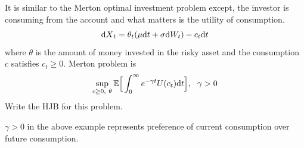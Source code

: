 \documentclass[11pt]{book}
\newcommand{\dt}{\text{\normalfont d}t}
\newcommand{\dX}{\text{\normalfont d}X}
\newcommand{\dW}{\text{\normalfont d}W}
\begin{document}
\begin{ex}
    {}
    It is similar to the Merton optimal investment problem except, the investor is consuming from the account and what matters is the utility of consumption.
    \begin{equation}
        {\dX}_t=\theta_t(\mu {\dt}+ \sigma \dW_t)-c_t{\dt}
    \end{equation}
    where $\theta$ is the amount of money invested in the risky asset and the consumption $c$ satisfies $c_t\ge0$.
    Merton problem is 
    \begin{equation}
        \sup_{c\ge0,~\theta}\mathbb{E}\Big[\int_0^\infty e^{-\gamma t}U(c_t){\dt}\Big], ~~\gamma>0
    \end{equation}
    Write the HJB for this problem.
\end{ex}
\begin{rem}
    $\gamma>0$ in the above example represents preference of current consumption over future consumption.
\end{rem}


\end{document}
